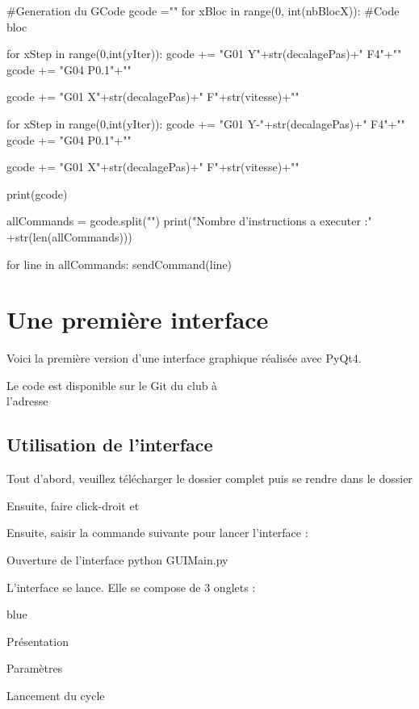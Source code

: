 \begin{Python}
#Generation du GCode
gcode =""
for xBloc in range(0, int(nbBlocX)):
    #Code bloc
    
    for xStep in range(0,int(yIter)):
        gcode += "G01 Y"+str(decalagePas)+" F4"+"\n"
        gcode += "G04 P0.1"+"\n"
    
    gcode += "G01 X"+str(decalagePas)+" F"+str(vitesse)+"\n"
    
    for xStep in range(0,int(yIter)):
        gcode += "G01 Y-"+str(decalagePas)+" F4"+"\n"
        gcode += "G04 P0.1"+"\n"
    
    gcode += "G01 X"+str(decalagePas)+" F"+str(vitesse)+"\n"
    

print(gcode)

allCommands = gcode.split("\n")
print("Nombre d'instructions a executer :" +str(len(allCommands)))

for line in allCommands:
    sendCommand(line)
        
 

\end{Python}



\section{Une première interface}

Voici la première version d'une interface graphique réalisée avec PyQt4.

Le code est disponible sur le Git du club à \\
l'adresse 

\subsection{Utilisation de l'interface}

Tout d'abord, veuillez télécharger le dossier complet puis se rendre dans le dossier 

Ensuite, faire click-droit et 

Ensuite, saisir la commande suivante pour lancer l'interface : 

\begin{Bash}{Ouverture de l'interface}
python GUIMain.py
\end{Bash}

L'interface se lance. Elle se compose de 3 onglets : 

\begin{items}{blue}{\Triangle}
    \item Présentation
    \item Paramètres
    \item Lancement du cycle
\end{items}

